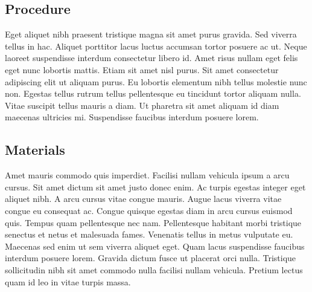 \documentclass[letterpaper,\myfontsize]{article}
\begin{document}

\subsection{Procedure}

Eget aliquet nibh praesent tristique magna sit amet purus gravida. Sed viverra tellus in hac. Aliquet porttitor lacus luctus accumsan tortor posuere ac ut. Neque laoreet suspendisse interdum consectetur libero id. Amet risus nullam eget felis eget nunc lobortis mattis. Etiam sit amet nisl purus. Sit amet consectetur adipiscing elit ut aliquam purus. Eu lobortis elementum nibh tellus molestie nunc non. Egestas tellus rutrum tellus pellentesque eu tincidunt tortor aliquam nulla. Vitae suscipit tellus mauris a diam. Ut pharetra sit amet aliquam id diam maecenas ultricies mi. Suspendisse faucibus interdum posuere lorem.


\subsection{Materials}

Amet mauris commodo quis imperdiet. Facilisi nullam vehicula ipsum a arcu cursus. Sit amet dictum sit amet justo donec enim. Ac turpis egestas integer eget aliquet nibh. A arcu cursus vitae congue mauris. Augue lacus viverra vitae congue eu consequat ac. Congue quisque egestas diam in arcu cursus euismod quis. Tempus quam pellentesque nec nam. Pellentesque habitant morbi tristique senectus et netus et malesuada fames. Venenatis tellus in metus vulputate eu. Maecenas sed enim ut sem viverra aliquet eget. Quam lacus suspendisse faucibus interdum posuere lorem. Gravida dictum fusce ut placerat orci nulla. Tristique sollicitudin nibh sit amet commodo nulla facilisi nullam vehicula. Pretium lectus quam id leo in vitae turpis massa.
\end{document}
